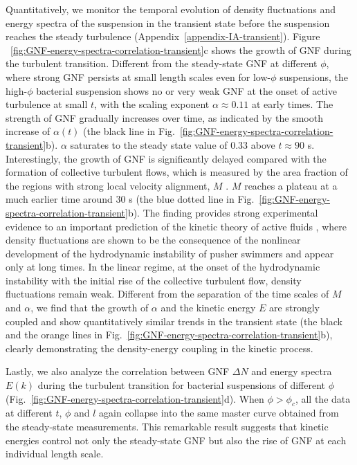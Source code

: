 \documentclass[twocolumn,aps,prx,amsmath,amssymb,longbibliography]{revtex4-2}
\begin{document}
Quantitatively, we monitor the temporal evolution of density fluctuations and energy spectra of the suspension in the transient state before the suspension reaches the steady turbulence (Appendix~\ref{appendix-IA-transient}). Figure ~\ref{fig:GNF-energy-spectra-correlation-transient}c shows the growth of GNF during the turbulent transition. Different from the steady-state GNF at different $\phi$, where strong GNF persists at small length scales even for low-$\phi$ suspensions, the high-$\phi$ bacterial suspension shows no or very weak GNF at the onset of active turbulence at small $t$, with the scaling exponent $\alpha \approx 0.11$ at early times. The strength of GNF gradually increases over time, as indicated by the smooth increase of $\alpha(t)$ (the black line in Fig.~\ref{fig:GNF-energy-spectra-correlation-transient}b). $\alpha$ saturates to the steady state value of 0.33 above $t \approx 90$ s. Interestingly, the growth of GNF is significantly delayed compared with the formation of collective turbulent flows, which is measured by the area fraction of the regions with strong local velocity alignment, $M$ \cite{Cisneros2011, Peng2020}.
$M$ reaches a plateau at a much earlier time around 30 s (the blue dotted line in Fig.~\ref{fig:GNF-energy-spectra-correlation-transient}b). The finding provides strong experimental evidence to an important prediction of the kinetic theory of active fluids \cite{Saintillan2008a,Saintillan2008b}, where density fluctuations are shown to be the consequence of the nonlinear development of the hydrodynamic instability of pusher swimmers and appear only at long times. In the linear regime, at the onset of the hydrodynamic instability with the initial rise of the collective turbulent flow, density fluctuations remain weak. Different from the separation of the time scales of $M$ and $\alpha$, we find that the growth of $\alpha$ and the kinetic energy $E$ are strongly coupled and show quantitatively similar trends in the transient state (the black and the orange lines in Fig.~\ref{fig:GNF-energy-spectra-correlation-transient}b), clearly demonstrating the density-energy coupling in the kinetic process.

Lastly, we also analyze the correlation between GNF $\Delta N$ and energy spectra $E(k)$ during the turbulent transition for bacterial suspensions of different $\phi$ (Fig.~\ref{fig:GNF-energy-spectra-correlation-transient}d). When $\phi>\phi_c$, all the data at different $t$, $\phi$ and $l$ again collapse into the same master curve obtained from the steady-state measurements.
This remarkable result suggests that kinetic energies control not only the steady-state GNF but also the rise of GNF at each individual length scale.
\end{document}
